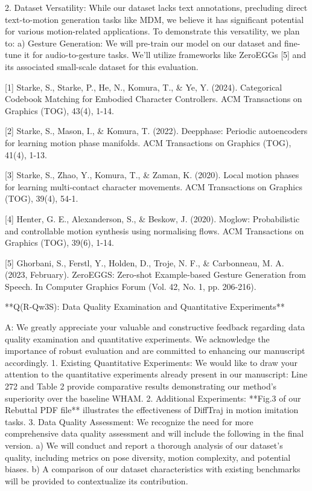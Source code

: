 2. Dataset Versatility:
While our dataset lacks text annotations, precluding direct text-to-motion generation tasks like MDM, we believe it has significant potential for various motion-related applications. To demonstrate this versatility, we plan to:
a) Gesture Generation:
We will pre-train our model on our dataset and fine-tune it for audio-to-gesture tasks. We'll utilize frameworks like ZeroEGGs [5] and its associated small-scale dataset for this evaluation.



[1] Starke, S., Starke, P., He, N., Komura, T., & Ye, Y. (2024). Categorical Codebook Matching for Embodied Character Controllers. ACM Transactions on Graphics (TOG), 43(4), 1-14.

[2] Starke, S., Mason, I., & Komura, T. (2022). Deepphase: Periodic autoencoders for learning motion phase manifolds. ACM Transactions on Graphics (TOG), 41(4), 1-13.

[3] Starke, S., Zhao, Y., Komura, T., & Zaman, K. (2020). Local motion phases for learning multi-contact character movements. ACM Transactions on Graphics (TOG), 39(4), 54-1.

[4] Henter, G. E., Alexanderson, S., & Beskow, J. (2020). Moglow: Probabilistic and controllable motion synthesis using normalising flows. ACM Transactions on Graphics (TOG), 39(6), 1-14.

[5] Ghorbani, S., Ferstl, Y., Holden, D., Troje, N. F., & Carbonneau, M. A. (2023, February). ZeroEGGS: Zero‐shot Example‐based Gesture Generation from Speech. In Computer Graphics Forum (Vol. 42, No. 1, pp. 206-216).






**Q(R-Qw3S): Data Quality Examination and Quantitative Experiments**

A: We greatly appreciate your valuable and constructive feedback regarding data quality examination and quantitative experiments. We acknowledge the importance of robust evaluation and are committed to enhancing our manuscript accordingly.
1. Existing Quantitative Experiments:
We would like to draw your attention to the quantitative experiments already present in our manuscript: Line 272 and Table 2 provide comparative results demonstrating our method's superiority over the baseline WHAM.
2. Additional Experiments: **Fig.3 of our Rebuttal PDF file** illustrates the effectiveness of DiffTraj in motion imitation tasks.
3. Data Quality Assessment:
We recognize the need for more comprehensive data quality assessment and will include the following in the final version. 
a) We will conduct and report a thorough analysis of our dataset's quality, including metrics on pose diversity, motion complexity, and potential biases.
b) A comparison of our dataset characteristics with existing benchmarks will be provided to contextualize its contribution.

